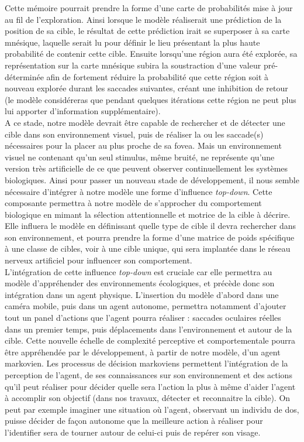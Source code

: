 Cette mémoire pourrait prendre la forme d'une carte de probabilités mise à jour au fil de l'exploration.
Ainsi lorsque le modèle réaliserait une prédiction de la position de sa cible, le résultat de cette prédiction irait se superposer à sa carte mnésique, laquelle serait lu pour définir le lieu présentant la plus haute probabilité de contenir cette cible.
Ensuite lorsqu'une région aura été explorée, sa représentation sur la carte mnésique subira la soustraction d'une valeur pré-déterminée afin de fortement réduire la probabilité que cette région soit à nouveau explorée durant les saccades suivantes, créant une inhibition de retour (le modèle considéreras que pendant quelques itérations cette région ne peut plus lui apporter d'information supplémentaire). \autocite{Najemnik2005, Werner2014, Zhaoping2014} \\
A ce stade, notre modèle devrait être capable de rechercher et de détecter une cible dans son environnement visuel, puis de réaliser la ou les saccade(s) nécessaires pour la placer au plus proche de sa fovea.
Mais un environnement visuel ne contenant qu'un seul stimulus, même bruité, ne représente qu'une version très artificielle de ce que peuvent observer continuellement les systèmes biologiques.
Ainsi pour passer un nouveau stade de développement, il nous semble nécessaire d'intégrer à notre modèle une forme d'influence \textit{top-down}.
Cette composante permettra à notre modèle de s'approcher du comportement biologique en mimant la sélection attentionnelle et motrice de la cible à décrire.
Elle influera le modèle en définissant quelle type de cible il devra rechercher dans son environnement, et pourra prendre la forme d'une matrice de poids spécifique à une classe de cibles, voir à une cible unique, qui sera implantée dans le réseau nerveux artificiel pour influencer son comportement. \autocite{Werner2014} \\
L'intégration de cette influence \textit{top-down} est cruciale car elle permettra au modèle d'appréhender des environnements écologiques, et précède donc son intégration dans un agent physique.
L'insertion du modèle d'abord dans une caméra mobile, puis dans un agent autonome, permettra notamment d'ajouter tout un panel d'actions que l'agent pourra réaliser : saccades oculaires réelles dans un premier temps, puis déplacements dans l'environnement et autour de la cible.
Cette nouvelle échelle de complexité perceptive et comportementale pourra être appréhendée par le développement, à partir de notre modèle, d'un agent markovien.
Les processus de décision markoviens permettent l'intégration de la perception de l'agent, de ses connaissances sur son environnement et des actions qu'il peut réaliser pour décider quelle sera l'action la plus à même d'aider l'agent à accomplir son objectif (dans nos travaux, détecter et reconnaitre la cible).
On peut par exemple imaginer une situation où l'agent, observant un individu de dos, puisse décider de façon autonome que la meilleure action à réaliser pour l'identifier sera de tourner autour de celui-ci puis de repérer son visage. \autocite{Butko2010, Najemnik2005, Zhaoping2014} \\

